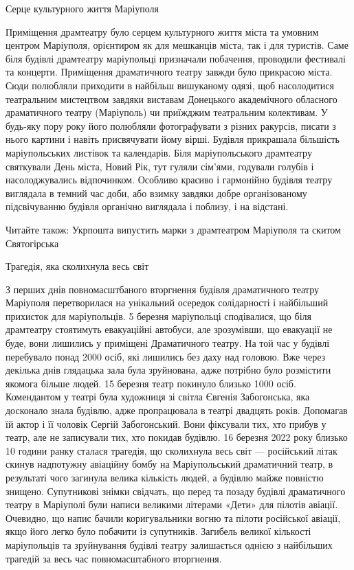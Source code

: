 Серце культурного життя Маріуполя

Приміщення драмтеатру було серцем культурного життя міста та умовним центром
Маріуполя, орієнтиром як для мешканців міста, так і для туристів. Саме біля
будівлі драмтеатру маріупольці призначали побачення, проводили фестивалі та
концерти. Приміщення драматичного театру завжди було прикрасою міста. Сюди
полюбляли приходити в найбільш вишуканому одязі, щоб насолодитися театральним
мистецтвом завдяки виставам Донецького академічного обласного драматичного
театру (Маріуполь) чи приїжджим театральним колективам. У будь-яку пору року
його полюбляли фотографувати з різних ракурсів, писати з нього картини і навіть
присвячувати йому вірші. Будівля прикрашала більшість маріупольських листівок
та календарів. Біля маріупольського драмтеатру святкували День міста, Новий
Рік, тут гуляли сім'ями, годували голубів і насолоджувались відпочинком.
Особливо красиво і гармонійно будівля театру виглядала в темний час доби, або
взимку завдяки добре організованому підсвічуванню будівля органічно виглядала і
поблизу, і на відстані.

Читайте також: Укрпошта випустить марки з драмтеатром Маріуполя та скитом
Святогірська

Трагедія, яка сколихнула весь світ

З перших днів повномасштбаного вторгнення будівля драматичного театру Маріуполя
перетворилася на унікальний осередок солідарності і найбільший прихисток для
маріупольців. 5 березня маріупольці сподівалися, що біля драмтеатру стоятимуть
евакуаційні автобуси, але зрозумівши, що евакуації не буде, вони лишились у
приміщені Драматичного театру. На той час у будівлі перебувало понад 2000 осіб,
які лишились без даху над головою. Вже через декілька днів глядацька зала була
зруйнована, адже потрібно було розмістити якомога більше людей. 15 березня
театр покинуло близько 1000 осіб. Комендантом у театрі була художниця зі світла
Євгенія Забогонська, яка досконало знала будівлю, адже пропрацювала в театрі
двадцять років. Допомагав їй актор і її чоловік Сергій Забогонський. Вони
фіксували тих, хто прибув у театр, але не записували тих, хто покидав будівлю.
16 березня 2022 року близько 10 години ранку сталася трагедія, що сколихнула
весь світ — російський літак скинув надпотужну авіаційну бомбу на
Маріупольський драматичний театр, в результаті чого загинула велика кількість
людей, а будівлю майже повністю знищено. Супутникові знімки свідчать, що перед
та позаду будівлі драматичного театру в Маріуполі були написи великими літерами
«Дети» для пілотів авіації. Очевидно, що напис бачили коригувальники вогню та
пілоти російської авіації, якщо його легко було побачити із супутників.
Загибель великої кількості маріупольців та зруйнування будівлі театру
залишається однією з найбільших трагедій за весь час повномасштабного
вторгнення.

